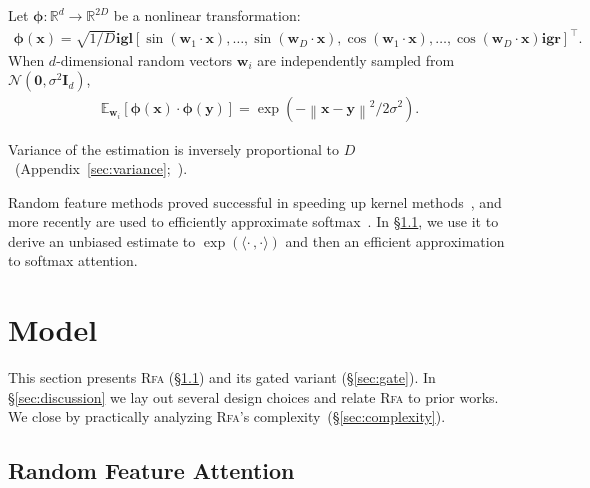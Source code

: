 \begin{theorem}\label{thm:bochner}
Let $\boldsymbol{\phi}: \mathbb{R}^d \rightarrow\mathbb{R}^{2D}$ be a nonlinear transformation:
\begin{align}\label{eq:bochner}
    \boldsymbol{\phi}\left({\mathbf{x}}\right) = \sqrt{1/D}
    \mathbf{igl}[
        \sin\left({\mathbf{w}}_1\cdot{\mathbf{x}}\right),
        \dots,
        \sin\left({\mathbf{w}}_D\cdot{\mathbf{x}}\right),
        \cos\left({\mathbf{w}}_1\cdot{\mathbf{x}}\right),
        \dots,
        \cos\left({\mathbf{w}}_D\cdot{\mathbf{x}}\right)
    \mathbf{igr}]^\top.
\end{align}
When $d$-dimensional random vectors ${\mathbf{w}}_i$
are independently sampled from ${\mathcal{N}}({\mathbf{0}}, \sigma^2{\mathbf{I}}_d)$,
\begin{align}\label{eq:approx_gaussian_kernel}
\mathbb{E}_{{\mathbf{w}}_i}\left[\boldsymbol{\phi}\left({\mathbf{x}}\right)\cdot \boldsymbol{\phi}\left({\mathbf{y}}\right)\right]
= \exp\left({-\left\lVert{\mathbf{x}}-{\mathbf{y}}\right\rVert^2/2\sigma^2}\right).
\end{align}
\end{theorem}

Variance of the estimation is inversely proportional to $D$~({Appendix~\ref{sec:variance}};~\citealp{yu2016orf}).

Random feature methods proved successful in speeding up kernel methods~\citep[\emph{inter alia}]{junier2015fast,avron2017faster,sun2019random}, and more recently are used to efficiently approximate softmax~\citep{rawat2019sampled}. In \S\ref{sec:rfa}, we use it to derive an unbiased estimate to $\exp(\langle\boldsymbol{\cdot}\,,\boldsymbol{\cdot}\rangle)$
and then an efficient approximation to softmax attention.

\section{Model}
\label{sec:model} 

This section presents \textsc{Rfa} (\S\ref{sec:rfa}) 
and its gated variant (\S\ref{sec:gate}).
In \S\ref{sec:discussion}
we lay out several design choices and relate \textsc{Rfa} to prior works. We close by practically analyzing
\textsc{Rfa}'s complexity~(\S\ref{sec:complexity}).

\subsection{Random Feature Attention}\label{sec:rfa}

